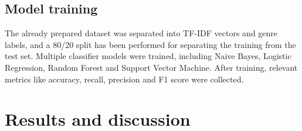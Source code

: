 \documentclass[11pt, a4paper]{article}
\begin{document}
\subsection{Model training}
The already prepared dataset was separated into TF-IDF vectors and genre labels, and a 80/20 split has been performed for separating the training from the test set. Multiple classifier models were trained, including Naive Bayes, Logistic Regression, Random Forest and Support Vector Machine. After training, relevant metrics like accuracy, recall, precision and F1 score were collected.




\section{Results and discussion}








\end{document}
